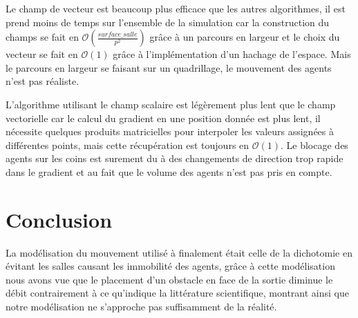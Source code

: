 \documentclass{article}
\newcommand{\bigo}{\mathcal{O}}
\begin{document}
Le champ de vecteur est beaucoup plus efficace que les autres algorithmes, il est
prend moins de temps sur l'ensemble de la simulation car la construction
du champs se fait en $\bigo\left(\frac{surface\_salle}{p^2}\right)$ grâce à un parcours en largeur
et le choix du vecteur se fait en $\bigo(1)$ grâce à l'implémentation d'un hachage de
l'espace. Mais le parcours en largeur se faisant sur un quadrillage, le mouvement
des agents n'est pas réaliste.

L'algorithme utilisant le champ scalaire est légèrement plus lent que le champ
vectorielle car le calcul du gradient en une position donnée est plus lent,
il nécessite quelques produits matricielles pour interpoler les valeurs assignées
à différentes points, mais cette récupération est toujours en $\bigo(1)$. Le blocage des
agents sur les coins est surement du à des changements de direction trop rapide
dans le gradient et au fait que le volume des agents n'est pas pris en compte.


\section{Conclusion}

La modélisation du mouvement utilisé à finalement était celle de la dichotomie en évitant les
salles causant les immobilité des agents, grâce à cette modélisation nous avons vue que
le placement d'un obstacle en face de la sortie diminue le débit contrairement à ce qu'indique
la littérature scientifique, montrant ainsi que notre modélisation ne s'approche pas suffisamment
de la réalité.
\end{document}
